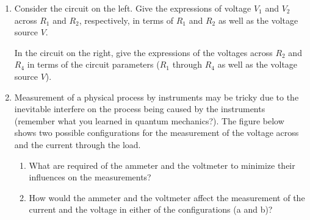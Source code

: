 \begin{enumerate}

\item Consider the circuit on the left. Give the expressions of voltage 
  $V_1$ and $V_2$ across $R_1$ and $R_2$, respectively, in terms of $R_1$ 
  and $R_2$ as well as the voltage source $V$.

  In the circuit on the right, give the expressions of the voltages across 
  $R_2$ and $R_4$ in terms of the circuit parameters ($R_1$ through $R_4$ 
  as well as the voltage source $V$).




\item Measurement of a physical process by instruments may be tricky due 
  to the inevitable interfere on the process being caused by the instruments
  (remember what you learned in quantum mechanics?). The figure below shows 
  two possible configurations for the measurement of the voltage across and 
  the current through the load. 


\begin{enumerate}
\item What are required of the ammeter and the voltmeter to minimize their
  influences on the measurements? 


\item How would the ammeter and the voltmeter affect the measurement of the
  current and the voltage in either of the configurations (a and b)?
\end{enumerate}


\end{enumerate}
